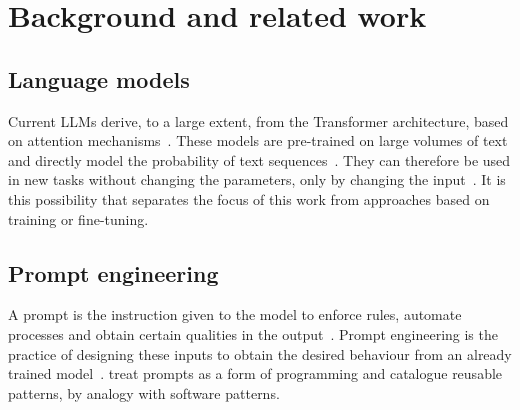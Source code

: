 \section{Background and related work}\label{sec:fundamentacao}
\subsection{Language models}
Current LLMs derive, to a large extent, from the Transformer architecture, based on attention
mechanisms~\citep{vaswani2017attention}. These models are pre-trained on large volumes of text and
directly model the probability of text sequences~\citep{liu2021pretrain}. They can therefore
be used in new tasks without changing the parameters, only by changing the input~\citep{sahoo2024survey}.
It is this possibility that separates the focus of this work from approaches based on training or fine-tuning.

\subsection{Prompt engineering}
A prompt is the instruction given to the model to enforce rules, automate processes and obtain certain
qualities in the output~\citep{white2023patterns}. Prompt engineering is the practice of designing these
inputs to obtain the desired behaviour from an already trained model~\citep{sahoo2024survey}.
\citet{white2023patterns} treat prompts as a form of programming and catalogue
reusable patterns, by analogy with software patterns.

